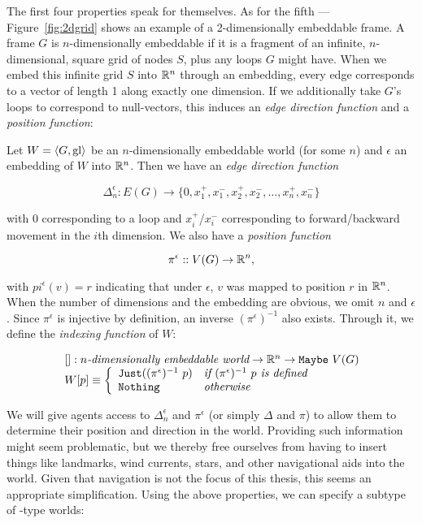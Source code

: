 The first four properties speak for themselves. As for the fifth --- Figure~\ref{fig:2dgrid} shows an example of a 2-dimensionally embeddable frame. A frame $G$ is $n$-dimensionally embeddable if it is a fragment of an infinite, $n$-dimensional, square grid of nodes $S$, plus any loops $G$ might have. When we embed this infinite grid $S$ into $\mathbb{R}^n$ through an embedding, every edge corresponds to a vector of length 1 along exactly one dimension. If we additionally take $G$'s loops to correspond to null-vectors, this induces an {\em edge direction function} and a {\em position function}:

\begin{definition}
Let $W = \langle G, \mathrm{gl} \rangle$ be an $n$-dimensionally embeddable world (for some $n$) and $\epsilon$ an embedding of $W$ into $\mathbb{R}^n$. Then we have an {\em edge direction function} 

$$\Delta_n^\epsilon : E(G) \rightarrow \{0,x_1^+,x_1^-,x_2^+,x_2^-,\dots,x_n^+,x_n^-\}$$

with $0$ corresponding to a loop and $x_i^+$/$x_i^-$ corresponding to forward/backward movement in the $i$th dimension. We also have a {\em position function}

$$\pi^\epsilon :: V(G) \rightarrow \mathbb{R}^n,$$

with $pi^\epsilon(v) = r$ indicating that under $\epsilon$, $v$ was mapped to position $r$ in $\mathbb{R}^n$. When the number of dimensions and the embedding are obvious, we omit $n$ and $\epsilon$.
Since $\pi^\epsilon$ is injective by definition, an inverse $(\pi^\epsilon)^{-1}$ also exists. Through it, we define the {\em indexing function} of $W$:

$$
	\begin{array}{l}
		[] : n\textit{-dimensionally embeddable world} \rightarrow \mathbb{R}^n \rightarrow \mathtt{Maybe}\ V(G)\\
		W[p] \equiv \left\{
			\begin{array}{l l}
				\mathtt{Just } ((\pi^\epsilon)^{-1}\ p) & \textit{if } (\pi^\epsilon)^{-1}\ p \textit{ is defined}\\
				\mathtt{Nothing} & \textit{otherwise}
			\end{array}
			\right.
	\end{array}
$$
\end{definition}

We will give agents access to $\Delta_n^\epsilon$ and $\pi^\epsilon$ (or simply $\Delta$ and $\pi$) to allow them to determine their position and direction in the world. Providing such information might seem problematic, but we thereby free ourselves from having to insert things like landmarks, wind currents, stars, and other navigational aids into the world. Given that navigation is not the focus of this thesis, this seems an appropriate simplification. Using the above properties, we can specify a subtype of \wext-type worlds:

